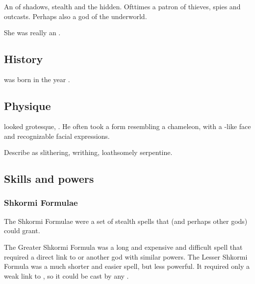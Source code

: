 \section{\Nasshikerr}
\index{\Nasshikerr}
An  of shadows, stealth and the hidden. 
Ofttimes a patron of thieves, spies and outcasts. 
Perhaps also a god of the underworld.

She was really an \ophidian.









\subsection{History}
\Nasshikerr was born in the year .









\subsection{Physique}
\Nasshikerr looked grotesque, .
He often took a form resembling a chameleon, with a \scatha-like face and recognizable facial expressions. 

Describe \Nasshikerr as slithering, writhing, loathsomely serpentine.









\subsection{Skills and powers}





\subsubsection{Shkormi Formulae}
The Shkormi Formulae were a set of stealth spells that \Nasshikerr (and perhaps other gods) could grant. 

The Greater Shkormi Formula was a long and expensive and difficult spell that required a direct link to \Nasshikerr or another god with similar powers.
The Lesser Shkormi Formula was a much shorter and easier spell, but less powerful. 
It required only a weak link to \Nasshikerr, so it could be cast by any \rethyax.

